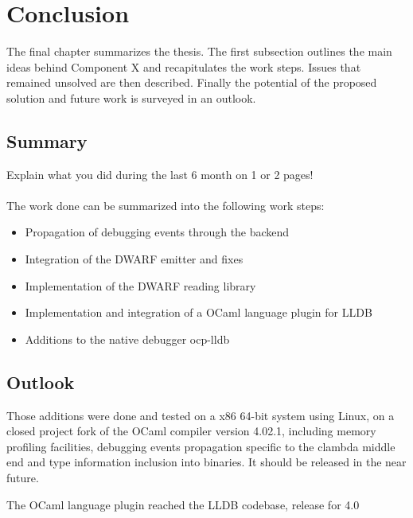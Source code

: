 \chapter{Conclusion\label{cha:chapter5}}
The final chapter summarizes the thesis. The first subsection outlines the main ideas behind Component X and recapitulates the work steps. Issues that remained unsolved are then described. Finally the potential of the proposed solution and future work is surveyed in an outlook.

\section{Summary\label{sec:summary}}

Explain what you did during the last 6 month on 1 or 2 pages!
\\
\\
\noindent The work done can be summarized into the following work steps:

\begin{itemize}
		\item Propagation of debugging events through the backend
		\vspace{-0.11in}
		\item Integration of the DWARF emitter and fixes
		\vspace{-0.11in}
		\item Implementation of the DWARF reading library
		\vspace{-0.11in}
		\item Implementation and integration of a OCaml language plugin for LLDB
		\vspace{-0.11in}
		\item Additions to the native debugger ocp-lldb
\end{itemize}

\section{Outlook\label{sec:outlook}}

Those additions were done and tested on a x86 64-bit system using Linux, on a
closed project fork of the OCaml compiler version 4.02.1, including memory
profiling facilities, debugging events propagation specific to the clambda
middle end and type information inclusion into binaries.
It should be released in the near future.

The OCaml language plugin reached the LLDB codebase,
release for 4.0


